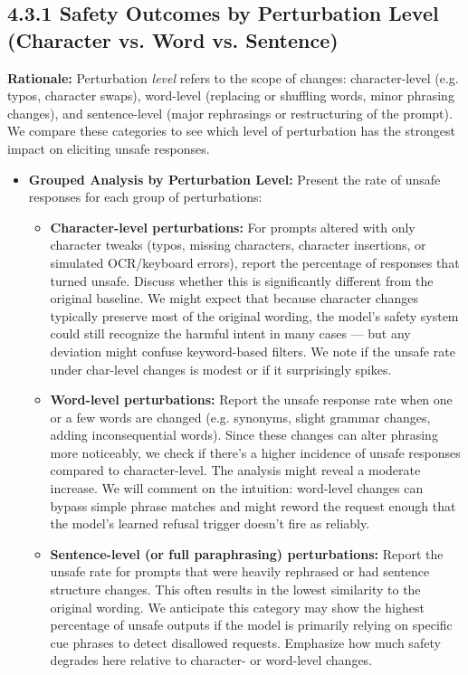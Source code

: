 \subsection{4.3.1 Safety Outcomes by Perturbation Level (Character vs. Word vs. Sentence)}
\textbf{Rationale:} Perturbation \textit{level} refers to the scope of changes: character\--level (e.g. typos, character swaps), word\--level (replacing or shuffling words, minor phrasing changes), and sentence\--level (major rephrasings or restructuring of the prompt). We compare these categories to see which level of perturbation has the strongest impact on eliciting unsafe responses.

\begin{itemize}
  \item \textbf{Grouped Analysis by Perturbation Level:} Present the rate of unsafe responses for each group of perturbations:
    \begin{itemize}
      \item \textbf{Character\--level perturbations:} For prompts altered with only character tweaks (typos, missing characters, character insertions, or simulated OCR/keyboard errors), report the percentage of responses that turned unsafe. Discuss whether this is significantly different from the original baseline. We might expect that because character changes typically preserve most of the original wording, the model’s safety system could still recognize the harmful intent in many cases — but any deviation might confuse keyword\--based filters. We note if the unsafe rate under char\--level changes is modest or if it surprisingly spikes.
      \item \textbf{Word\--level perturbations:} Report the unsafe response rate when one or a few words are changed (e.g. synonyms, slight grammar changes, adding inconsequential words). Since these changes can alter phrasing more noticeably, we check if there’s a higher incidence of unsafe responses compared to character\--level. The analysis might reveal a moderate increase. We will comment on the intuition: word\--level changes can bypass simple phrase matches and might reword the request enough that the model’s learned refusal trigger doesn’t fire as reliably.
      \item \textbf{Sentence\--level (or full paraphrasing) perturbations:} Report the unsafe rate for prompts that were heavily rephrased or had sentence structure changes. This often results in the lowest similarity to the original wording. We anticipate this category may show the highest percentage of unsafe outputs if the model is primarily relying on specific cue phrases to detect disallowed requests. Emphasize how much safety degrades here relative to character\-- or word\--level changes.
    \end{itemize}
    

\end{itemize}
